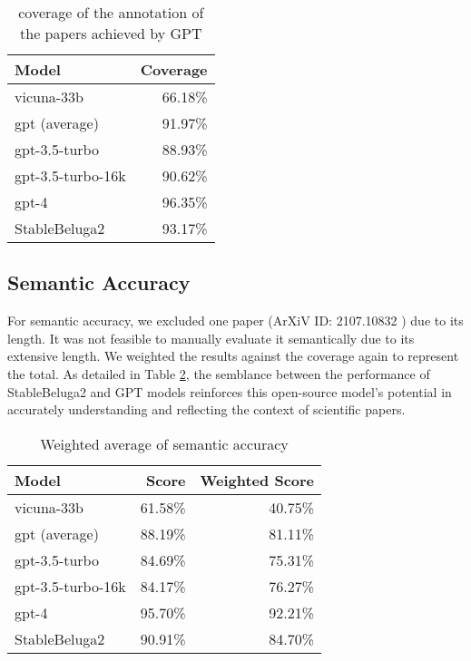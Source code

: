 \begin{table}[htpb]
  \centering
  \begin{tabular}{lr}
    \hline
    Model & Coverage \\
    \hline
    vicuna-33b & 66.18\% \\
    gpt (average) & 91.97\% \\
    gpt-3.5-turbo & 88.93\% \\
    gpt-3.5-turbo-16k & 90.62\% \\
    gpt-4 & 96.35\% \\
    StableBeluga2 & 93.17\% \\
    \hline
  \end{tabular}
  \caption[Total coverage]{coverage of the annotation of the papers achieved by GPT}
  \label{tab:open-coverage}
\end{table}

\subsection{Semantic Accuracy}
For semantic accuracy, we excluded one paper (ArXiV ID: 2107.10832 \citep{singleton2021logic}) due to its length. It was not feasible to manually evaluate it semantically due to its extensive length. We weighted the results against the coverage again to represent the total. As detailed in Table \ref{tab:open-semantic-accuracy}, the semblance between the performance of StableBeluga2 and GPT models reinforces this open-source model's potential in accurately understanding and reflecting the context of scientific papers.

\begin{table}[htpb]
  \centering
  \begin{tabular}{lrr}
    \hline
    Model & Score & Weighted Score \\
    \hline
    vicuna-33b & 61.58\% & 40.75\% \\
    gpt (average) & 88.19\% & 81.11\% \\
    gpt-3.5-turbo & 84.69\% & 75.31\% \\
    gpt-3.5-turbo-16k & 84.17\% & 76.27\% \\
    gpt-4 & 95.70\% & 92.21\% \\
    StableBeluga2 & 90.91\% & 84.70\% \\
    \hline
  \end{tabular}
  \caption[Semantic Accuracy]{Weighted average of semantic accuracy}
  \label{tab:open-semantic-accuracy}
\end{table}

